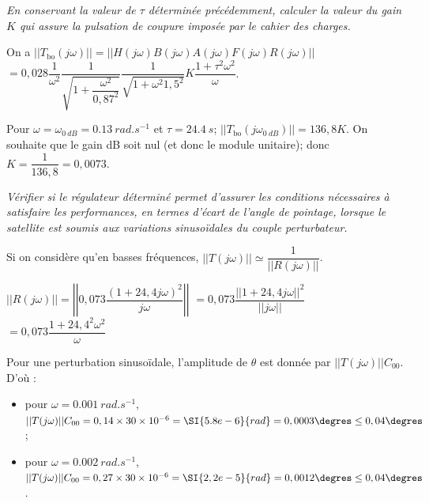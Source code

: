 \question{\label{q_22}}\textit{En conservant la valeur de $\tau$ déterminée précédemment, 
calculer la valeur du gain $K$ qui assure la pulsation de coupure imposée par le cahier des charges.}
\ifprof
\begin{corrige}
On a $||T_{\text{bo}}(j\omega)||=||H(j\omega)B(j\omega)A(j\omega)F(j\omega)R(j\omega)||$
$=0,028 \dfrac{1}{\omega^2}\dfrac{1}{\sqrt{1+\dfrac{\omega^2}{0,87^2}}}\dfrac{1}{\sqrt{1+\omega^2 1,5^2}} K \dfrac{1+\tau^2\omega^2}{\omega}$.

Pour $\omega = \omega_{\SI{0}{dB}}=\SI{0,13}{rad.s^{-1}}$ et $\tau=\SI{24,4}{s}$; 
$||T_{\text{bo}}(j\omega_{\SI{0}{dB}})|| = 136,8 K$. On souhaite que le gain dB soit nul (et donc le module unitaire); donc $K= \dfrac{1}{136,8} = 0,0073$.
\end{corrige}
\else
\fi

\question{\label{q_23}}\textit{Vérifier si le régulateur déterminé permet d’assurer les conditions nécessaires à satisfaire les performances,
en termes d’écart de l’angle de pointage, lorsque le satellite est soumis aux variations sinusoïdales du couple
perturbateur.}
\ifprof
\begin{corrige}

Si on considère qu'en basses fréquences,  $||T(j\omega)||\simeq \dfrac{1}{|| R\left(j\omega\right)||}$.


$|| R\left(j\omega\right)|| = \left|\left| 0,073  \dfrac{\left(1+24,4 j \omega\right)^2}{j\omega}\right|\right|$
$=0,073  \dfrac{ \left|\left| 1+24,4 j \omega \right|\right| ^2}{ \left|\left| j\omega\right|\right|}$
$=0,073  \dfrac{ 1+24,4^2  \omega^2 }{ \omega}$

Pour une perturbation sinusoïdale, l'amplitude de $\theta$ est donnée par $||T(j\omega)|| C_{00}$.  D'où :
\begin{itemize}
\item pour $\omega = \SI{0,001}{rad.s^{-1}}$, $||T(j\omega)|| C_{00} = 0,14 \times 30 \times 10^{-6} = \SI{5.8e-6}{rad} = 0,0003\degres\leq 0,04\degres$;
\item pour $\omega = \SI{0,002}{rad.s^{-1}}$, $||T(j\omega)|| C_{00} = 0,27 \times 30 \times 10^{-6} = \SI{2,2e-5}{rad} = 0,0012\degres\leq 0,04\degres$.
\end{itemize}
%  
\end{corrige}
\else
\fi

